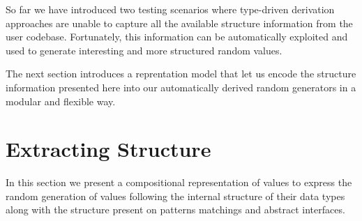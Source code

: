 




So far we have introduced two testing scenarios where type-driven derivation
approaches are unable to capture all the available structure information from
the user codebase.
%
Fortunately, this information can be automatically exploited and used to
generate interesting and more structured random values.

The next section introduces a reprentation model that let us encode the
structure information presented here into our automatically derived random
generators in a modular and flexible way.



\section{Extracting Structure} \label{sec:hrep}




In this section we present a compositional representation of values to express
the random generation of values following the internal structure of their data
types along with the structure present on patterns matchings and abstract
interfaces.



